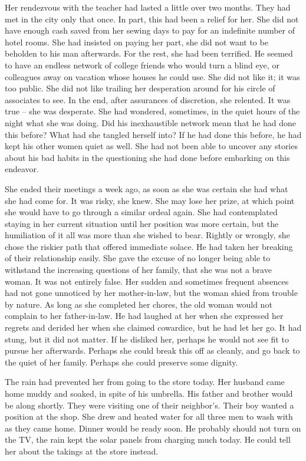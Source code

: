 \documentclass{article}
\begin{document}
Her rendezvous with the teacher had lasted a little over two months. They had met in the city only that once. In part, this had been a relief for her. She did not have enough cash saved from her sewing days to pay for an indefinite number of hotel rooms. She had insisted on paying her part, she did not want to be beholden to his man afterwards. For the rest, she had been terrified. He seemed to have an endless network of college friends who would turn a blind eye, or colleagues away on vacation whose houses he could use. She did not like it; it was too public. She did not like trailing her desperation around for his circle of associates to see. In the end, after assurances of discretion, she relented. It was true -- she was desperate.  She had wondered, sometimes, in the quiet hours of the night what she was doing. Did his inexhaustible network mean that he had done this before? What had she tangled herself into? If he had done this before, he had kept his other women quiet as well. She had not been able to uncover any stories about his bad habits in the questioning she had done before embarking on this endeavor.

She ended their meetings a week ago, as soon as she was certain she had what she had come for. It was risky, she knew. She may lose her prize, at which point she would have to go through a similar ordeal again. She had contemplated staying in her current situation until her position was more certain, but the humiliation of it all was more than she wished to bear. Rightly or wrongly, she chose the riskier path that offered immediate solace. He had taken her breaking of their relationship easily. She gave the excuse of no longer being able to withstand the increasing questions of her family, that she was not a brave woman. It was not entirely false. Her sudden and sometimes frequent absences had not gone unnoticed by her mother-in-law, but the woman shied from trouble by nature. As long as she completed her chores, the old woman would not complain to her father-in-law. He had laughed at her when she expressed her regrets and derided her when she claimed cowardice, but he had let her go. It had stung, but it did not matter. If he disliked her, perhaps he would not see fit to pursue her afterwards. Perhaps she could break this off as cleanly, and go back to the quiet of her family. Perhaps she could preserve some dignity.

The rain had prevented her from going to the store today. Her husband came home muddy and soaked, in spite of his umbrella. His father and brother would be along shortly. They were visiting one of their neighbor's. Their boy wanted a position at the shop. She drew and heated water for all three men to wash with as they came home. Dinner would be ready soon. He probably should not turn on the TV, the rain kept the solar panels from charging much today. He could tell her about the takings at the store instead.
\end{document}
